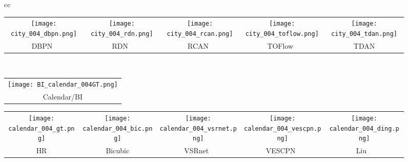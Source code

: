 \documentclass[10pt,twocolumn,letterpaper]{article}
\newcommand{\widthscalefive}{0.125}
\begin{document}
\begin{figure*}
\begin{tabular}{cc}
\begin{adjustbox}{valign=t}
\begin{tabular}{ccccc}
				\\
				\texttt{[image: city\_004\_dbpn.png]} \hspace{-1.5mm} &
				\texttt{[image: city\_004\_rdn.png]} \hspace{-1.5mm} &
				\texttt{[image: city\_004\_rcan.png]} \hspace{-1.5mm} &
				\texttt{[image: city\_004\_toflow.png]}\hspace{-1.5mm} &
				\texttt{[image: city\_004\_tdan.png]}
				\\
				DBPN~\cite{haris2018deep} \hspace{-1.5mm} &
				RDN~\cite{zhang2018residual} \hspace{-1.5mm} &
				RCAN~\cite{zhang2018image} \hspace{-1.5mm} &
				TOFlow~\cite{xue2017video} \hspace{-1.5mm} &
				TDAN
				\\
			\end{tabular}
			\end{adjustbox}

         \\
    \begin{adjustbox}{valign=t}
\begin{tabular}{c}
				\texttt{[image: BI\_calendar\_004GT.png]}
				\\
				Calendar/BI
			
			\end{tabular}
		\end{adjustbox}
		\hspace{-2.3mm}
		\begin{adjustbox}{valign=t}
\begin{tabular}{ccccc}
				\texttt{[image: calendar\_004\_gt.png]} \hspace{-1.5mm} &
				\texttt{[image: calendar\_004\_bic.png]} \hspace{-1.5mm} &
				\texttt{[image: calendar\_004\_vsrnet.png]} \hspace{-1.5mm} &
				\texttt{[image: calendar\_004\_vescpn.png]}\hspace{-1.5mm} &
				\texttt{[image: calendar\_004\_ding.png]}
				\\
				HR \hspace{-1.5mm} &
				Bicubic \hspace{-1.5mm} &
				VSRnet~\cite{kappeler2016video} \hspace{-1.5mm} &
				VESCPN~\cite{caballero2017real}\hspace{-1.5mm} &
				Liu \etal~\cite{liu2017robust}


\end{tabular}
\end{adjustbox}
\end{tabular}
\end{figure*}
\end{document}
